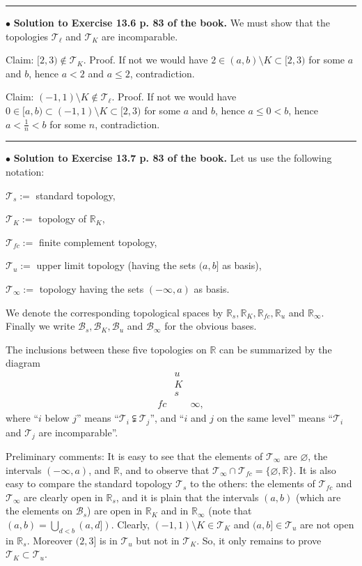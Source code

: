 \documentclass[12pt,letterpaper]{article}
\newcommand{\B}{\mathcal B}
\newcommand{\hs}{\bigskip\hrule\medskip}
\newcommand{\mc}{\mathcal}
\newcommand{\noi}{\noindent}%
\newcommand{\sm}{\setminus}
\newcommand{\R}{\mathbb R}
\newcommand{\T}{\mathcal T}
\begin{document}
\smallskip\hrule\medskip 

\noi$\bullet$ \textbf{Solution to Exercise 13.6 p. 83 of the book.} We must show that the topologies $\mc T_\ell$ and $\mc T_K$ are incomparable. 

\noi Claim: $[2,3)\notin\mc T_K$. Proof. If not we would have $2\in(a,b)\sm K\subset[2,3)$ for some $a$ and $b$, hence $a<2$ and $a\le2$, contradiction. 

\noi Claim: $(-1,1)\sm K\notin\mc T_\ell$. Proof. If not we would have $0\in[a,b)\subset(-1,1)\sm K\subset[2,3)$ for some $a$ and $b$, hence $a\le0<b$, hence $a<\frac1n<b$ for some $n$, contradiction. 

\hs

\noi$\bullet$ \textbf{Solution to Exercise 13.7 p. 83 of the book.} Let us use the following notation: 

$\T_s:=$ standard topology, 

$\T_K:=$ topology of $\R_K$, 

$\T_{fc}:=$ finite complement topology, 

$\T_u:=$ upper limit topology (having the sets $(a,b]$ as basis), 

$\T_\infty:=$ topology having the sets $(-\infty,a)$ as basis. 

\noi We denote the corresponding topological spaces by $\R_s,\R_K,\R_{fc},\R_u$ and $\R_\infty$. Finally we write $\B_s,\B_K,\B_u$ and $\B_\infty$ for the obvious bases. 

The inclusions between these five topologies on $\R$ can be summarized by the diagram 
$$
\begin{matrix}
&u\\ 
&K\\ 
&s\\ 
fc&&\infty,
\end{matrix}
$$ 
where ``$i$ below $j$'' means ``$\T_i\subsetneqq\T_j$'', and ``$i$ and $j$ on the same level'' means ``$\T_i$ and $\T_j$ are incomparable''. 

Preliminary comments: It is easy to see that the elements of $\T_\infty$ are $\varnothing$, the intervals $(-\infty,a)$, and $\R$, and to observe that $\T_\infty\cap\T_{fc}=\{\varnothing,\R\}$. It is also easy to compare the standard topology $\T_s$ to the others: the elements of $\T_{fc}$ and $\T_\infty$ are clearly open in $\R_s$, and it is plain that the intervals $(a,b)$ (which are the elements on $\B_s$) are open in $\R_K$ and in $\R_\infty$ (note that $(a,b)=\bigcup_{d<b}(a,d])$. Clearly, $(-1,1)\sm K\in\T_K$ and $(a,b]\in\T_u$ are not open in $\R_s$. Moreover $(2,3]$ is in $\T_u$ but not in $\T_K$. So, it only remains to prove $\T_K\subset\T_u$. 
\end{document}
